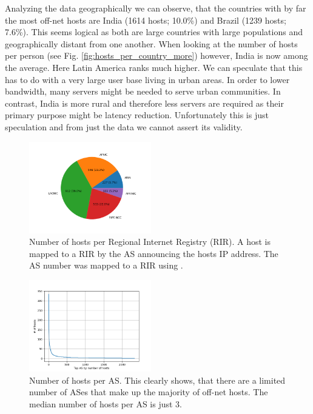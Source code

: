 \documentclass[sigconf,10pt,nonacm]{acmart}
\begin{document}
Analyzing the data geographically we can observe, that the countries with by far the most off-net hosts are India (1614 hosts; 10.0\%) and Brazil (1239 hosts; 7.6\%). This seems logical as both are large countries with large populations and geographically distant from one another. When looking at the number of hosts per person (see Fig. \ref{fig:hosts_per_country_more}) however, India is now among the average. Here Latin America ranks much higher. We can speculate that this has to do with a very large user base living in urban areas. In order to lower bandwidth, many servers might be needed to serve urban communities. In contrast, India is more rural and therefore less servers are required as their primary purpose might be latency reduction. Unfortunately this is just speculation and from just the data we cannot assert its validity.

\begin{figure}[t]
    \centering
    \includegraphics[width=0.475\textwidth]{graphics/hosts_per_rir.png}
    \caption[Number of hosts per RIR]{Number of hosts per Regional Internet Registry (RIR). A host is mapped to a RIR by the AS announcing the hosts IP address. The AS number was mapped to a RIR using \cite{iana_autonomous_nodate}.}
    \label{fig:hosts_per_rir}
\end{figure}

\begin{figure}[t]
    \centering
    \includegraphics[width=0.475\textwidth]{graphics/hosts_per_AS.png}
    \caption[Top 15 ASes by number of hosts]{Number of hosts per AS. This clearly shows, that there are a limited number of ASes that make up the majority of off-net hosts. The median number of hosts per AS is just 3.}
    \label{fig:hosts_per_as}
\end{figure}
\end{document}
